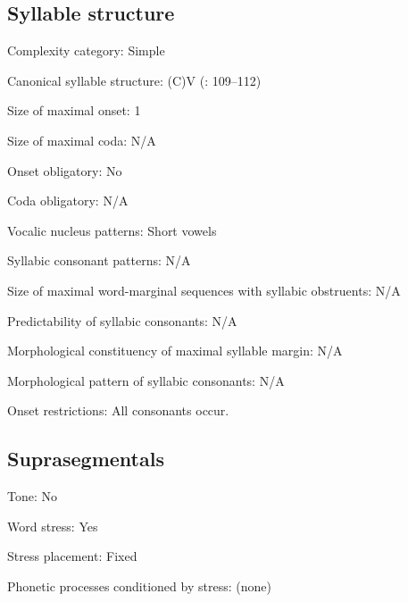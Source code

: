 {\subsection*{Syllable structure}
\begin{appendixdesc}

\item[Complexity category:] Simple

\item[Canonical syllable structure:] (C)V (\citealt{Romero-Figeroa1997}: 109--112)

\item[Size of maximal onset:] 1

\item[Size of maximal coda:] N/A

\item[Onset obligatory:] No

\item[Coda obligatory:] N/A

\item[Vocalic nucleus patterns:] Short vowels

\item[Syllabic consonant patterns:] N/A

\item[Size of maximal word-marginal sequences with syllabic obstruents:] N/A

\item[Predictability of syllabic consonants:] N/A

\item[Morphological constituency of maximal syllable margin:] N/A

\item[Morphological pattern of syllabic consonants:] N/A

\item[Onset restrictions:] All consonants occur.
\end{appendixdesc}
\subsection*{Suprasegmentals}
\begin{appendixdesc}
\item[Tone:] No

\item[Word stress:] Yes

\item[Stress placement:] Fixed

\item[Phonetic processes conditioned by stress:] (none)


\end{appendixdesc}}
